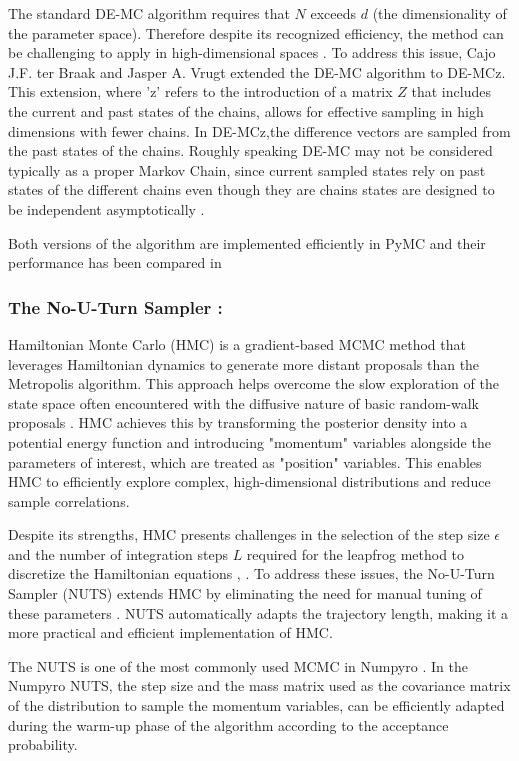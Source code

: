 \documentclass[nonatbib,preprint,12pt,authoryear]{elsarticle}
\begin{document}
The standard DE-MC algorithm requires that $N$ exceeds $d$ (the dimensionality of the parameter space). Therefore despite its recognized efficiency, the method can be challenging to apply in high-dimensional spaces \cite{ter_braak_differential_2008}. To address this issue, Cajo J.F. ter Braak and Jasper A. Vrugt extended the DE-MC algorithm to DE-MCz. This extension, where 'z' refers to the introduction of a matrix $Z$ that includes the current and past states of the chains, allows for effective sampling in high dimensions with fewer chains. In DE-MCz,the difference vectors are sampled from the past states of the chains. 
Roughly speaking DE-MC may not be considered typically as a proper Markov Chain, since current sampled states rely on past states of the different chains even though they are chains states are designed to be independent asymptotically \cite{braak_markov_2006}. 

Both versions of the algorithm are implemented efficiently in PyMC and their performance has been compared in \cite{Pymc_DEM_DEMz_comparison}

\subsubsection{The No-U-Turn Sampler :}
Hamiltonian Monte Carlo (HMC) is a gradient-based MCMC method that leverages Hamiltonian dynamics to generate more distant proposals than the Metropolis algorithm. This approach helps overcome the slow exploration of the state space often encountered with the diffusive nature of basic random-walk proposals \cite{Brooks_NEAL_HMC_2011}. HMC achieves this by transforming the posterior density into a potential energy function and introducing "momentum" variables alongside the parameters of interest, which are treated as "position" variables. This enables HMC to efficiently explore complex, high-dimensional distributions and reduce sample correlations.

Despite its strengths, HMC presents challenges in the selection of the step size $\epsilon$ and the number of integration steps $L$ required for the leapfrog method to discretize the Hamiltonian equations \cite{Brooks_NEAL_HMC_2011}, \cite{hoffman_no-u-turn_2014}. To address these issues, the No-U-Turn Sampler (NUTS) extends HMC by eliminating the need for manual tuning of these parameters \cite{hoffman_no-u-turn_2014}. NUTS automatically adapts the trajectory length, making it a more practical and efficient implementation of HMC.

The NUTS is one of the most commonly used MCMC in Numpyro \cite{phan2019composable}. In the Numpyro NUTS, the step size and the mass matrix used as the covariance matrix of the distribution to sample the momentum variables, can be efficiently adapted during the warm-up phase of the algorithm according to the acceptance probability. 
\end{document}

